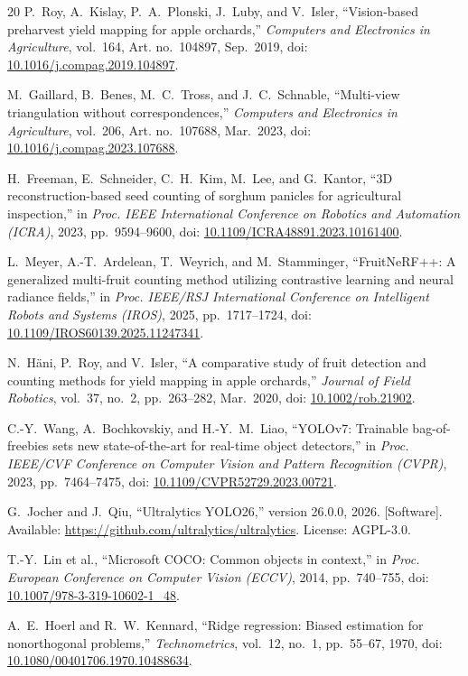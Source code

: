 \documentclass[conference]{IEEEtran}
\begin{document}
\begin{thebibliography}{20}
P.~Roy, A.~Kislay, P.~A.~Plonski, J.~Luby, and V.~Isler,
``Vision-based preharvest yield mapping for apple orchards,''
\textit{Computers and Electronics in Agriculture}, vol.~164, Art. no.~104897,
Sep.~2019, doi: \url{10.1016/j.compag.2019.104897}.

M.~Gaillard, B.~Benes, M.~C.~Tross, and J.~C.~Schnable,
``Multi-view triangulation without correspondences,''
\textit{Computers and Electronics in Agriculture}, vol.~206, Art. no.~107688,
Mar.~2023, doi: \url{10.1016/j.compag.2023.107688}.

H.~Freeman, E.~Schneider, C.~H.~Kim, M.~Lee, and G.~Kantor,
``3D reconstruction-based seed counting of sorghum panicles for agricultural
inspection,''
in \textit{Proc. IEEE International Conference on Robotics and Automation
(ICRA)}, 2023, pp.~9594--9600, doi:
\url{10.1109/ICRA48891.2023.10161400}.

L.~Meyer, A.-T.~Ardelean, T.~Weyrich, and M.~Stamminger,
``FruitNeRF++: A generalized multi-fruit counting method utilizing contrastive
learning and neural radiance fields,''
in \textit{Proc. IEEE/RSJ International Conference on Intelligent Robots and
Systems (IROS)}, 2025, pp.~1717--1724, doi:
\url{10.1109/IROS60139.2025.11247341}.

N.~H\"{a}ni, P.~Roy, and V.~Isler,
``A comparative study of fruit detection and counting methods for yield
mapping in apple orchards,''
\textit{Journal of Field Robotics}, vol.~37, no.~2, pp.~263--282, Mar.~2020,
doi: \url{10.1002/rob.21902}.

C.-Y.~Wang, A.~Bochkovskiy, and H.-Y.~M.~Liao,
``YOLOv7: Trainable bag-of-freebies sets new state-of-the-art for real-time
object detectors,''
in \textit{Proc. IEEE/CVF Conference on Computer Vision and Pattern
Recognition (CVPR)}, 2023, pp.~7464--7475,
doi: \url{10.1109/CVPR52729.2023.00721}.

G.~Jocher and J.~Qiu,
``Ultralytics YOLO26,'' version 26.0.0, 2026. [Software].
Available: \url{https://github.com/ultralytics/ultralytics}. License:
AGPL-3.0.

T.-Y.~Lin et al.,
``Microsoft COCO: Common objects in context,''
in \textit{Proc. European Conference on Computer Vision (ECCV)}, 2014,
pp.~740--755, doi: \url{10.1007/978-3-319-10602-1_48}.

A.~E.~Hoerl and R.~W.~Kennard,
``Ridge regression: Biased estimation for nonorthogonal problems,''
\textit{Technometrics}, vol.~12, no.~1, pp.~55--67, 1970,
doi: \url{10.1080/00401706.1970.10488634}.


\end{thebibliography}
\end{document}
